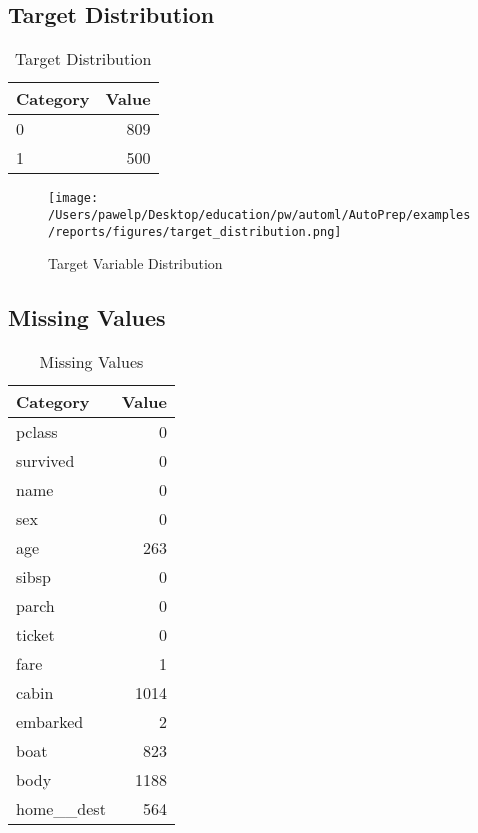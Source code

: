 \documentclass{article}%
\begin{document}
%
\subsection{Target Distribution}%
\label{subsec:TargetDistribution}%

%


\begin{table}[H]%
\begin{center}%
\begin{tabular}{l r}%
\hline%
\textbf{Category}&\textbf{Value}\\%
\hline%
0&809\\%
1&500\\%
\hline%
\end{tabular}%
\end{center}%
\caption{Target Distribution}%
\end{table}

%


\begin{figure}[H]%
\centering%
\texttt{[image: /Users/pawelp/Desktop/education/pw/automl/AutoPrep/examples/reports/figures/target\_distribution.png]}%
\caption{Target Variable Distribution}%
\end{figure}

%
\subsection{Missing Values}%
\label{subsec:MissingValues}%

%


\begin{table}[H]%
\begin{center}%
\begin{tabular}{l r}%
\hline%
\textbf{Category}&\textbf{Value}\\%
\hline%
pclass&0\\%
survived&0\\%
name&0\\%
sex&0\\%
age&263\\%
sibsp&0\\%
parch&0\\%
ticket&0\\%
fare&1\\%
cabin&1014\\%
embarked&2\\%
boat&823\\%
body&1188\\%
home\_\_dest&564\\%
\hline%
\end{tabular}%
\end{center}%
\caption{Missing Values}%
\end{table}
\end{document}
